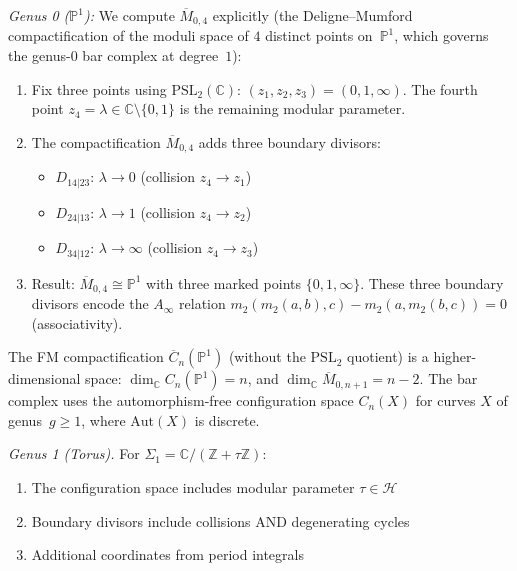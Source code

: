 \begin{example}\label{ex:config-genera}
\emph{Genus 0 ($\mathbb{P}^1$):} We compute $\overline{M}_{0,4}$ explicitly (the Deligne--Mumford compactification of the moduli space of $4$ distinct points on~$\mathbb{P}^1$, which governs the genus-$0$ bar complex at degree~$1$):
\begin{enumerate}
\item Fix three points using $\mathrm{PSL}_2(\mathbb{C})$: $(z_1, z_2, z_3) = (0, 1, \infty)$.  The fourth point $z_4 = \lambda \in \mathbb{C} \setminus \{0,1\}$ is the remaining modular parameter.

\item The compactification $\overline{M}_{0,4}$ adds three boundary divisors:
   \begin{itemize}
   \item $D_{14|23}$: $\lambda \to 0$ (collision $z_4 \to z_1$)
   \item $D_{24|13}$: $\lambda \to 1$ (collision $z_4 \to z_2$)
   \item $D_{34|12}$: $\lambda \to \infty$ (collision $z_4 \to z_3$)
   \end{itemize}

\item Result: $\overline{M}_{0,4} \cong \mathbb{P}^1$ with three marked points $\{0, 1, \infty\}$.  These three boundary divisors encode the $A_\infty$ relation $m_2(m_2(a,b),c) - m_2(a, m_2(b,c)) = 0$ (associativity).
\end{enumerate}

\begin{remark}
The FM compactification $\overline{C}_n(\mathbb{P}^1)$ (without the $\mathrm{PSL}_2$ quotient) is a higher-dimensional space: $\dim_{\mathbb{C}} C_n(\mathbb{P}^1) = n$, and $\dim_{\mathbb{C}} \overline{M}_{0,n+1} = n - 2$.  The bar complex uses the automorphism-free configuration space $C_n(X)$ for curves $X$ of genus~$g \geq 1$, where $\mathrm{Aut}(X)$ is discrete.
\end{remark}

\emph{Genus 1 (Torus).} For $\Sigma_1 = \mathbb{C}/(\mathbb{Z} + \tau\mathbb{Z})$:
\begin{enumerate}
\item The configuration space includes modular parameter $\tau \in \mathcal{H}$
\item Boundary divisors include collisions AND degenerating cycles
\item Additional coordinates from period integrals
\end{enumerate}


\end{example}
